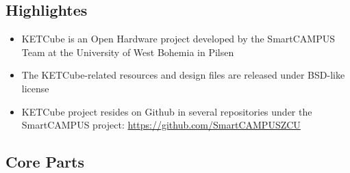 
\subsection{Highlightes}

\begin{frame}%
  \begin{itemize}
    \item KETCube is an Open Hardware project developed by the SmartCAMPUS Team at the University of West Bohemia in Pilsen
    \item The KETCube-related resources and design files are released under BSD-like license
    \item KETCube project resides on Github in several repositories under the SmartCAMPUS project: \url{https://github.com/SmartCAMPUSZCU}
  \end{itemize}
  
\end{frame}

\subsection{Core Parts}

